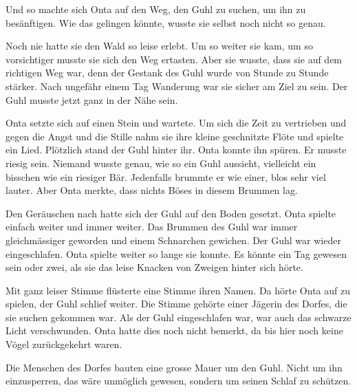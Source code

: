 Und so machte sich Onta auf den Weg, den Guhl zu suchen, um ihn zu besänftigen. Wie das gelingen könnte, wusste sie selbst noch nicht so genau. 

Noch nie hatte sie den Wald so leise erlebt. Um so weiter sie kam, um so vorsichtiger musste sie sich den Weg ertasten. Aber sie wusste, dass sie auf dem richtigen Weg war, denn der Gestank des Guhl wurde von Stunde zu Stunde stärker. Nach ungefähr einem Tag Wanderung war sie sicher am Ziel zu sein. Der Guhl musste jetzt ganz in der Nähe sein.

Onta setzte sich auf einen Stein und wartete. Um sich die Zeit zu vertrieben und gegen die Angst und die Stille nahm sie ihre kleine geschnitzte Flöte und spielte ein Lied. Plötzlich stand der Guhl hinter ihr. Onta konnte ihn spüren. Er musste riesig sein. Niemand wusste genau, wie so ein Guhl aussieht, vielleicht ein bisschen wie ein riesiger Bär. Jedenfalls brummte er wie einer, blos sehr viel lauter. Aber Onta merkte, dass nichts Böses in diesem Brummen lag. 

Den Geräuschen nach hatte sich der Guhl auf den Boden gesetzt. Onta spielte einfach weiter und immer weiter. Das Brummen des Guhl war immer gleichmässiger geworden und einem Schnarchen gewichen. Der Guhl war wieder eingeschlafen. Onta spielte weiter so lange sie konnte. Es könnte ein Tag gewesen sein oder zwei, als sie das leise Knacken von Zweigen hinter sich hörte.

Mit ganz leiser Stimme flüsterte eine Stimme ihren Namen. Da hörte Onta auf zu spielen, der Guhl schlief weiter. Die Stimme gehörte einer Jägerin des Dorfes, die sie suchen gekommen war. Als der Guhl eingeschlafen war, war auch das schwarze Licht verschwunden. Onta hatte dies noch nicht bemerkt, da bis hier noch keine Vögel zurückgekehrt waren.

Die Menschen des Dorfes bauten eine grosse Mauer um den Guhl. Nicht um ihn einzusperren, das wäre unmöglich gewesen, sondern um seinen Schlaf zu schützen.  \hfill {\color{red}\decofourleft}
